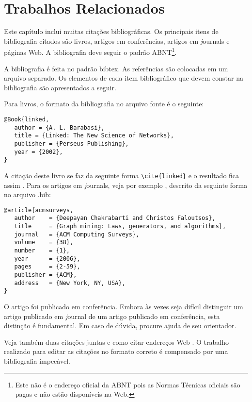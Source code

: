 %
%

\chapter{Trabalhos Relacionados}

Este capítulo inclui muitas citações bibliográficas. Os principais
itens de bibliografia citados são livros, artigos em conferências,
artigos em {\textit journals} e páginas Web. A bibliografia deve seguir o
padrão ABNT\footnote{Este não é o endereço oficial da
ABNT pois as Normas Técnicas oficiais são pagas e não estão disponíveis na Web.}.

A bibliografia é feita no padrão {\ttfamily bibtex}. As referências são
colocadas em um arquivo separado. Os elementos de
cada item bibliográfico que devem constar na bibliografia são
apresentados a seguir.

Para livros, o formato da bibliografia no arquivo fonte é o seguinte:

\begin{verbatim}
@Book{linked,
   author = {A. L. Barabasi},
   title = {Linked: The New Science of Networks},
   publisher = {Perseus Publishing},
   year = {2002},
}
\end{verbatim}

A citação deste livro se faz da seguinte forma \verb#\cite{linked}# e o resultado fica assim \cite{linked}.
Para os artigos em {\textit journals}, veja por exemplo \cite{acmsurveys},
descrito da seguinte forma no arquivo {\ttfamily .bib}:

\begin{verbatim}
@article{acmsurveys,
   author    = {Deepayan Chakrabarti and Christos Faloutsos},
   title     = {Graph mining: Laws, generators, and algorithms},
   journal   = {ACM Computing Surveys},
   volume    = {38},
   number    = {1},
   year      = {2006},
   pages     = {2-59},
   publisher = {ACM},
   address   = {New York, NY, USA},
}
\end{verbatim}

O artigo \cite{3faloutsos} foi publicado em conferência. Embora
às vezes seja difícil distinguir um artigo publicado em {\textit
 journal} de um artigo publicado em conferência, esta distinção é
fundamental. Em caso de dúvida, procure ajuda de seu orientador.

Veja também duas citações juntas \cite{rp99,mar00} e como citar
endereços Web \cite{irl:06}.
O trabalho realizado para editar as citações no formato correto é
compensado por uma bibliografia impecável.
